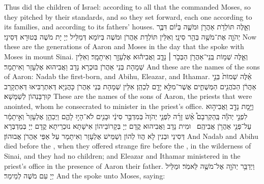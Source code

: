 {Thus did the children of Israel: according to all that the \lord\space commanded Moses, so they pitched by their standards, and so they set forward, each one according to its families, and according to its fathers’ houses.}{}
\newperek
{}%
{וְאֵ֛לֶּה תּוֹלְדֹ֥ת אַהֲרֹ֖ן וּמֹשֶׁ֑ה בְּי֗וֹם דִּבֶּ֧ר יְהֹוָ֛ה אֶת־מֹשֶׁ֖ה בְּהַ֥ר סִינָֽי׃
}
{וְאִלֵּין תּוֹלְדָת אַהֲרֹן וּמֹשֶׁה בְּיוֹמָא דְּמַלֵּיל יְיָ יָת מֹשֶׁה בְּטוּרָא דְּסִינָי׃}
{Now these are the generations of Aaron and Moses in the day that the \lord\space spoke with Moses in mount Sinai.}{}
{וְאֵ֛לֶּה שְׁמ֥וֹת בְּֽנֵי־אַהֲרֹ֖ן הַבְּכֹ֣ר \small ׀\normalsize  נָדָ֑ב וַאֲבִיה֕וּא אֶלְעָזָ֖ר וְאִיתָמָֽר׃}
{וְאִלֵּין שְׁמָהָת בְּנֵי אַהֲרֹן בּוּכְרָא נָדָב וַאֲבִיהוּא אֶלְעָזָר וְאִיתָמָר׃}
{And these are the names of the sons of Aaron: Nadab the first-born, and Abihu, Eleazar, and Ithamar.}{}
{אֵ֗לֶּה שְׁמוֹת֙ בְּנֵ֣י אַהֲרֹ֔ן הַכֹּהֲנִ֖ים הַמְּשֻׁחִ֑ים אֲשֶׁר־מִלֵּ֥א יָדָ֖ם לְכַהֵֽן׃}
{אִלֵּין שְׁמָהָת בְּנֵי אַהֲרֹן כָּהֲנַיָּא דְּאִתְרַבִּיאוּ דְּאִתְקָרַב קוּרְבָּנְהוֹן לְשַׁמָּשָׁא׃}
{These are the names of the sons of Aaron, the priests that were anointed, whom he consecrated to minister in the priest’s office.}{}
{וַיָּ֣מׇת נָדָ֣ב וַאֲבִיה֣וּא לִפְנֵ֣י יְהֹוָ֡ה בְּֽהַקְרִבָם֩ אֵ֨שׁ זָרָ֜ה לִפְנֵ֤י יְהֹוָה֙ בְּמִדְבַּ֣ר סִינַ֔י וּבָנִ֖ים לֹא־הָי֣וּ לָהֶ֑ם וַיְכַהֵ֤ן אֶלְעָזָר֙ וְאִ֣יתָמָ֔ר עַל־פְּנֵ֖י אַהֲרֹ֥ן אֲבִיהֶֽם׃ \petucha 
{}}
{וּמִית נָדָב וַאֲבִיהוּא קֳדָם יְיָ בְּקָרוֹבֵיהוֹן אִישָׁתָא נוּכְרֵיתָא קֳדָם יְיָ בְּמַדְבְּרָא דְּסִינַי וּבְנִין לָא הֲווֹ לְהוֹן וְשַׁמֵּישׁ אֶלְעָזָר וְאִיתָמָר עַל אַפֵּי אַהֲרֹן אֲבוּהוֹן׃}
{And Nadab and Abihu died before the \lord, when they offered strange fire before the \lord, in the wilderness of Sinai, and they had no children; and Eleazar and Ithamar ministered in the priest’s office in the presence of Aaron their father.}{}
{וַיְדַבֵּ֥ר יְהֹוָ֖ה אֶל־מֹשֶׁ֥ה לֵּאמֹֽר׃}
{וּמַלֵּיל יְיָ עִם מֹשֶׁה לְמֵימַר׃}
{And the \lord\space spoke unto Moses, saying:}{}
